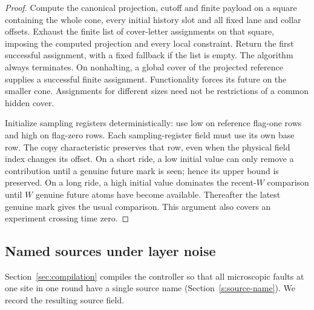 \begin{proof}
Compute the canonical projection, cutoff and finite payload on a
square containing the
whole cone, every initial history slot and all fixed lane and collar
offsets. Exhaust the finite list of cover-letter assignments on that
square, imposing the computed projection and every local constraint.
Return the first successful assignment, with a fixed fallback if the list
is empty. The algorithm always terminates. On nonhalting, a global cover
of the projected reference supplies a successful finite assignment.
Functionality forces its future on the smaller cone. Assignments for
different sizes need not be restrictions of a common hidden cover.

Initialize sampling registers deterministically: use low on reference flag-one rows
and high on flag-zero rows. Each sampling-register field must use its own base row.
The copy characteristic preserves that row, even when the physical field
index changes its offset. On a short ride, a low initial value can only
remove a contribution until a genuine future mark is seen; hence its
upper bound is preserved. On a long ride, a high initial value dominates
the recent-\(W\) comparison until \(W\) genuine future atoms have become
available. Thereafter the latest genuine mark gives the usual comparison.
This argument also covers an experiment crossing time zero.
\end{proof}

\subsection{Named sources under layer noise}\label{c:named-sources}
Section~\ref{sec:compilation} compiles the controller so that all microscopic faults at one site in one round have a single source name (Section~\ref{s:source-name}). We record the resulting source field.

